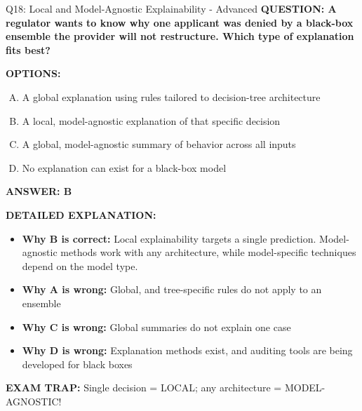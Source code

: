 \documentclass[8pt]{beamer}
\begin{document}
\begin{frame}[shrink=6]{Q18: Local and Model-Agnostic Explainability - Advanced}
\fontsize{6.5}{7.5}\selectfont
\textbf{QUESTION: A regulator wants to know why one applicant was denied by a black-box ensemble the provider will not restructure. Which type of explanation fits best?}

\vspace{0.1cm}
\textbf{OPTIONS:}
\begin{enumerate}[A.]
\item A global explanation using rules tailored to decision-tree architecture
\item A local, model-agnostic explanation of that specific decision
\item A global, model-agnostic summary of behavior across all inputs
\item No explanation can exist for a black-box model
\end{enumerate}

\vspace{0.1cm}
\textcolor{myblue}{\textbf{ANSWER: B}}

\vspace{0.1cm}
\textbf{DETAILED EXPLANATION:}
\begin{itemize}
\item \textbf{Why B is correct:} Local explainability targets a single prediction. Model-agnostic methods work with any architecture, while model-specific techniques depend on the model type.
\item \textbf{Why A is wrong:} Global, and tree-specific rules do not apply to an ensemble
\item \textbf{Why C is wrong:} Global summaries do not explain one case
\item \textbf{Why D is wrong:} Explanation methods exist, and auditing tools are being developed for black boxes
\end{itemize}

\textcolor{myred}{\textbf{EXAM TRAP:}} Single decision = LOCAL; any architecture = MODEL-AGNOSTIC!
\end{frame}
\end{document}
